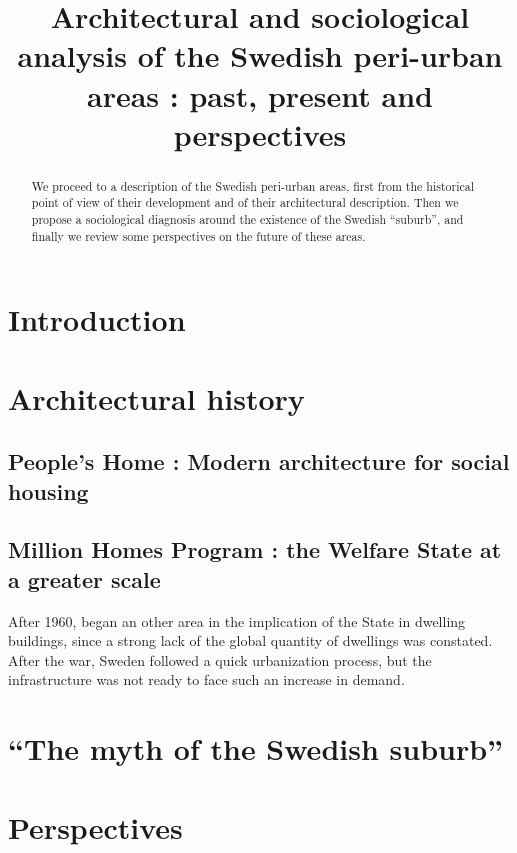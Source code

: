 \documentclass[english]{article}
\begin{document}
\title{Architectural and sociological analysis of the Swedish peri-urban
areas : past, present and perspectives}
\maketitle
\begin{abstract}
We proceed to a description of the Swedish peri-urban areas, first
from the historical point of view of their development and of their
architectural description. Then we propose a sociological diagnosis
around the existence of the Swedish ``suburb'', and finally we review
some perspectives on the future of these areas.
\end{abstract}

\section*{Introduction}


\section{Architectural history}


\subsection{People's Home : Modern architecture for social housing}


\subsection{Million Homes Program : the Welfare State at a greater scale}

After 1960, began an other area in the implication of the State in
dwelling buildings, since a strong lack of the global quantity of
dwellings was constated. After the war, Sweden followed a quick urbanization
process, but the infrastructure was not ready to face such an increase
in demand.


\section{``The myth of the Swedish suburb''}


\section{Perspectives}



\end{document}
